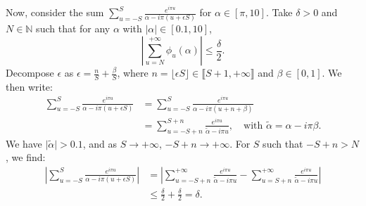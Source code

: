Now, consider the sum $\sum_{u=-S}^S \frac{e^{i\pi u}}{\alpha - i\pi(u + \epsilon S)}$ for $\alpha \in [\pi, 10]$. Take $\delta > 0$ and $N \in \mathbb{N}$ such that for any $\alpha$ with $\vert\alpha\vert \in [0.1, 10]$, 
\[
\left| \sum_{u=N}^{+\infty} \phi_u(\alpha) \right| \leq \frac{\delta}{2}.
\]
Decompose $\epsilon$ as $\epsilon = \frac{n}{S} + \frac{\beta}{S}$, where $n = \lfloor \epsilon S \rfloor \in \llbracket S+1, +\infty \rrbracket$ and $\beta \in [0,1]$. We then write:
\begin{align*}
    \sum_{u=-S}^S \frac{e^{i\pi u}}{\alpha - i\pi(u + \epsilon S)} 
    &= \sum_{u=-S}^S \frac{e^{i\pi u}}{\alpha - i\pi(u + n + \beta)} \\
    &= \sum_{u=-S+n}^{S+n} \frac{e^{i\pi u}}{\tilde{\alpha} - i\pi u}, \quad \text{with } \tilde{\alpha} = \alpha - i\pi \beta.
\end{align*}
We have $\vert \tilde{\alpha} \vert > 0.1$, and as $S \to +\infty$, $-S+n \to +\infty$. For $S$ such that $-S+n > N$, we find:
\begin{align*}
    \left| \sum_{u=-S}^S \frac{e^{i\pi u}}{\alpha - i\pi(u + \epsilon S)} \right| 
    &= \left| \sum_{u=-S+n}^{+\infty} \frac{e^{i\pi u}}{\tilde{\alpha} - i\pi u} - \sum_{u=S+n}^{+\infty} \frac{e^{i\pi u}}{\tilde{\alpha} - i\pi u} \right| \\
    &\leq \frac{\delta}{2} + \frac{\delta}{2} = \delta.
\end{align*}


